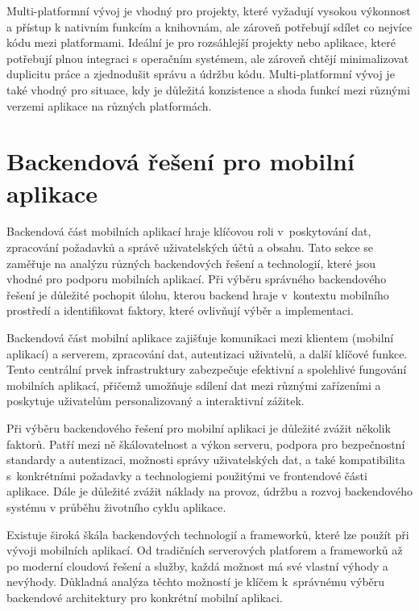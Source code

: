 Multi-platformní vývoj je vhodný pro projekty, které vyžadují vysokou výkonnost a přístup k nativním funkcím a knihovnám, ale zároveň potřebují sdílet co nejvíce kódu mezi platformami. Ideální je pro rozsáhlejší projekty nebo aplikace, které potřebují plnou integraci s operačním systémem, ale zároveň chtějí minimalizovat duplicitu práce a zjednodušit správu a údržbu kódu. Multi-platformní vývoj je také vhodný pro situace, kdy je důležitá konzistence a shoda funkcí mezi různými verzemi aplikace na různých platformách.

\section{Backendová řešení pro mobilní aplikace}

Backendová část mobilních aplikací hraje klíčovou roli v~poskytování dat, zpracování požadavků a správě uživatelských účtů a obsahu. Tato sekce se zaměřuje na analýzu různých backendových řešení a technologií, které jsou vhodné pro podporu mobilních aplikací. Při výběru správného backendového řešení je důležité pochopit úlohu, kterou backend hraje v~kontextu mobilního prostředí a identifikovat faktory, které ovlivňují výběr a implementaci.

Backendová část mobilní aplikace zajišťuje komunikaci mezi klientem (mobilní aplikací) a serverem, zpracování dat, autentizaci uživatelů, a další klíčové funkce. Tento centrální prvek infrastruktury zabezpečuje efektivní a spolehlivé fungování mobilních aplikací, přičemž umožňuje sdílení dat mezi různými zařízeními a poskytuje uživatelům personalizovaný a interaktivní zážitek.

Při výběru backendového řešení pro mobilní aplikaci je důležité zvážit několik faktorů. Patří mezi ně škálovatelnost a výkon serveru, podpora pro bezpečnostní standardy a autentizaci, možnosti správy uživatelských dat, a také kompatibilita s~konkrétními požadavky a technologiemi použitými ve frontendové části aplikace. Dále je důležité zvážit náklady na provoz, údržbu a rozvoj backendového systému v průběhu životního cyklu aplikace.

Existuje široká škála backendových technologií a frameworků, které lze použít při vývoji mobilních aplikací. Od tradičních serverových platforem a frameworků až po moderní cloudová řešení a služby, každá možnost má své vlastní výhody a nevýhody. Důkladná analýza těchto možností je klíčem k~správnému výběru backendové architektury pro konkrétní mobilní aplikaci.

